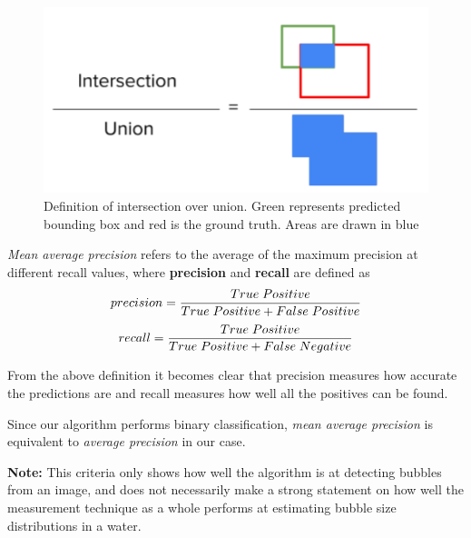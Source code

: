 		\begin{figure}
			\centering
			\includegraphics[scale=.5]{images/iou_def.png}
			\caption{Definition of intersection over union. Green represents predicted bounding box and red is the ground truth. Areas are drawn in blue}
			\label{fig:iou_def}
		\end{figure}				  
		  
		  \textit{Mean average precision} refers to the average of the maximum precision at different recall values, where \textbf{precision} and \textbf{recall} are defined as
		  \begin{equation}
		  	precision = \dfrac{True \hspace{.1cm} Positive}{True \hspace{.1cm}  Positive + False \hspace{.1cm}  Positive}
		  \end{equation}
		  \begin{equation}
		  	recall = \dfrac{True \hspace{.1cm}  Positive}{True \hspace{.1cm}  Positive + False \hspace{.1cm}  Negative}
		  \end{equation}

		From the above definition it becomes clear that precision measures how accurate the predictions are and recall measures how well all the positives can be found.
		
		Since our algorithm performs binary classification, \textit{mean average precision} is equivalent to \textit{average precision} in our case. 
		
		\textbf{Note:} This criteria only shows how well the algorithm is at detecting bubbles from an image, and does not necessarily make a strong statement on how well the measurement technique as a whole performs at estimating bubble size distributions in a water. 
		
		 



































